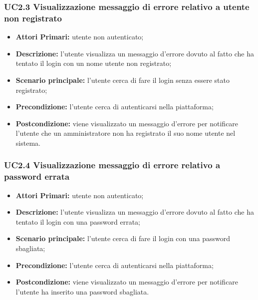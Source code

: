\subsubsection{UC2.3 Visualizzazione messaggio di errore relativo a utente non registrato}
\begin{itemize}
	\item \textbf{Attori Primari:} utente non autenticato;
	\item \textbf{Descrizione:} l'utente visualizza un messaggio d'errore dovuto al fatto che ha tentato il login con un nome utente non registrato;
	\item \textbf{Scenario principale:} l'utente cerca di fare il login senza essere stato registrato;
	\item \textbf{Precondizione:} l'utente cerca di autenticarsi nella piattaforma;
	\item \textbf{Postcondizione:} viene visualizzato un messaggio d'errore per notificare l'utente che un amministratore non ha registrato il suo nome utente nel sistema.
\end{itemize}

\subsubsection{UC2.4 Visualizzazione messaggio di errore relativo a password errata}
\begin{itemize}
	\item \textbf{Attori Primari:} utente non autenticato;
	\item \textbf{Descrizione:} l'utente visualizza un messaggio d'errore dovuto al fatto che ha tentato il login con una password errata;
	\item \textbf{Scenario principale:} l'utente cerca di fare il login con una password sbagliata;
	\item \textbf{Precondizione:} l'utente cerca di autenticarsi nella piattaforma;
	\item \textbf{Postcondizione:} viene visualizzato un messaggio d'errore per notificare l'utente ha inserito una password sbagliata.
\end{itemize}



